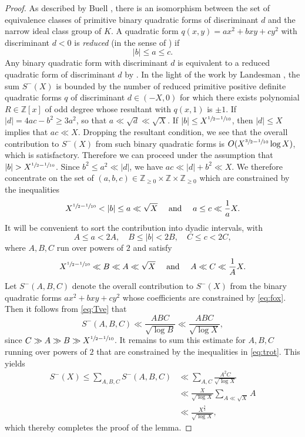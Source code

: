 \documentclass[JEP,XML,SOM,Unicode]{cedram}
\newcommand{\ZZ}{\mathbb{Z}}\let\Z\ZZ
\begin{document}
\begin{proof}
As described by Buell \cite[Prop.\,6.20]{Buell},
there is an isomorphism between the set of equivalence classes of primitive binary quadratic forms of discriminant $d$ and the narrow ideal class group of $K$. A quadratic form $q(x,y)=ax^2+bxy+cy^2$ with discriminant $d<0$ is \emph{reduced} (in the sense of \cite[Eq.\,(2.1)]{Buell}) if
\[
|b|\leq a\leq c.
\]
Any binary quadratic form with
discriminant $d$ is equivalent to a reduced quadratic form of
discriminant $d$ by \cite[Th.\,2.3]{Buell}.
In the light of the work by Landesman \cite[Th.\,1.1]{aaron}, the sum
$S^-(X)$ is bounded by the number of
reduced primitive positive definite quadratic forms $q$ of discriminant $d\in (-X,0)$ for which
there exists
polynomial $R\in \ZZ[x]$ of odd degree whose resultant with $q(x,1)$ is $\pm 1$.
If $|d|=4ac-b^2\geq 3a^2$, so that
$a\ll \sqrt{d}\ll \sqrt{X}$.
If $|b|\leq X^{\sfrac{1}{2}-\sfrac{1}{10}}$, then
$|d|\leq X$ implies that $ac\ll X$.
Dropping the resultant condition, we see that the overall contribution to $S^-(X)$ from
such binary quadratic forms
is $O(X^{\sfrac{3}{2}-\sfrac{1}{10}}\log X)$, which is satisfactory.
Therefore we can proceed under the assumption that $|b|>X^{\sfrac{1}{2}-\sfrac{1}{10}}$.
Since $b^2\leq a^2\ll |d|$, we have $ac\ll|d|+b^2\ll X$.
We therefore concentrate on the set of $(a,b,c)\in \Z_{\geq 0}\times \Z\times \Z_{\geq 0}$ which are constrained by the inequalities
\[
X^{\sfrac{1}{2}-\sfrac{1}{10}}<|b|\leq a\ll \sqrt{X}\quad \text{ and }\quad a\leq c\ll \frac{1}{a}X.
\]
It will be convenient to sort the contribution into dyadic intervals, with
\begin{equation}\label{eq:fox}
A\leq a<2A,\quad B\leq |b|<2B,\quad C\leq c<2C,
\end{equation}
where $A,B,C$ run over powers of $2$ and satisfy
\begin{equation}\label{eq:trot}
X^{\sfrac{1}{2}-\sfrac{1}{10}}\ll B\ll A\ll\sqrt{X}\quad \text{ and }\quad A\ll C\ll \frac{1}{A}X.
\end{equation}
Let $S^-(A,B,C)$ denote the overall contribution to $S^-(X)$ from the binary quadratic forms
$ax^2+bxy+cy^2$ whose coefficients are constrained by \eqref{eq:fox}.
Then it follows from \eqref{eq:Tve}
that
\[
S^-(A,B,C)\ll \frac{ABC}{\sqrt{\log B}}\ll
\frac{ABC}{\sqrt{\log X}},
\]
since $C\gg A\gg B\gg X^{\sfrac{1}{2}-\sfrac{1}{10}}$.
It remains to sum this estimate for
$A,B,C$ running over powers of $2$ that are constrained by the
inequalities in \eqref{eq:trot}. This yields
\begin{align*}
S^-(X)\leq \sum_{A,B,C} S^-(A,B,C)
&\ll \sum_{A,C}
\frac{A^2C}{\sqrt{\log X}}\\
&\ll \frac{X}{\sqrt{\log X}}
\sum_{A\ll \sqrt{X}}
A\\
&\ll \frac{X^{\frac{3}{2}}}{\sqrt{\log X}},
\end{align*}
which thereby completes the proof of the lemma.
\end{proof}
\end{document}
